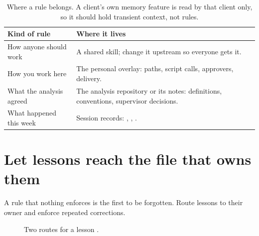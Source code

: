 \begin{table}[H]
  \small
  \begin{tabularx}{\textwidth}{L{0.3\textwidth}Y}
    \toprule
    Kind of rule & Where it lives \\
    \midrule
    How anyone should work & A shared skill; change it upstream so everyone gets it. \\
    How you work here & The personal overlay: paths, script calls, approvers, delivery. \\
    What the analysis agreed & The analysis repository or its notes: definitions,
    conventions, supervisor decisions. \\
    What happened this week & Session records: , ,
    . \\
    \bottomrule
  \end{tabularx}
  \caption{Where a rule belongs. A client's own memory feature is read by that client only,
    so it should hold transient context, not rules.}
  \label{tab:yours-owners}
\end{table}

\section{Let lessons reach the file that owns them}

\begin{headline}
  A rule that nothing enforces is the first to be forgotten. Route lessons to their owner
  and enforce repeated corrections.
\end{headline}

\begin{figure}[H]
  \centering
  \caption{Two routes for a lesson \cites[Extract lessons; Apply]{skill:reflect}[Fix each
      class at the highest level that works; Keep the rule table]{skill:correct}.}
  \label{fig:yours-lessons}
\end{figure}

